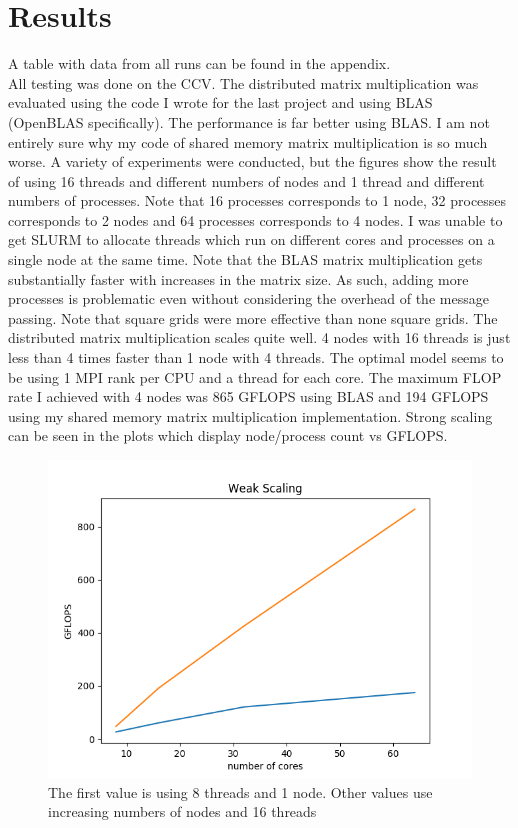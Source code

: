 \documentclass{article}
\begin{document}
\section{Results}

A table with data from all runs can be found in the appendix. \\

All testing was done on the CCV. The distributed matrix multiplication was evaluated using the code 
I wrote for the last project and
using BLAS (OpenBLAS specifically). The performance is far better using BLAS. I am not entirely sure why
my code of shared memory matrix multiplication is so much worse. A variety of experiments were conducted,
but the figures show the result of using 16 threads and different numbers of nodes and 1 thread and
different numbers of processes. Note that 16 processes corresponds to 1 node, 32 processes corresponds to 2
nodes and 64 processes corresponds to 4 nodes. I was unable to get SLURM to allocate threads which run on
different cores and processes on a single node at the same time. Note that the BLAS matrix multiplication
gets substantially faster with increases in the matrix size. As such, adding more processes is problematic
even without considering the overhead of the message passing. Note that square grids were 
more effective than none square grids. The distributed matrix multiplication scales quite well. 4 nodes with
16 threads is just less than 4 times faster than 1 node with 4 threads. The optimal model seems to be
using 1 MPI rank per CPU and a thread for each core. The maximum FLOP rate I achieved with 4 nodes was
865 GFLOPS using BLAS and 194 GFLOPS using my shared memory matrix multiplication implementation.
Strong scaling can be seen in the plots which display node/process count vs GFLOPS.

\begin{figure}[]
    \centering
    \caption{The first value is using 8 threads and 1 node. Other values use increasing numbers 
    of nodes and 16 threads}
    \includegraphics[width=0.8\linewidth]{weak_scaling.png}
\end{figure}
\end{document}
